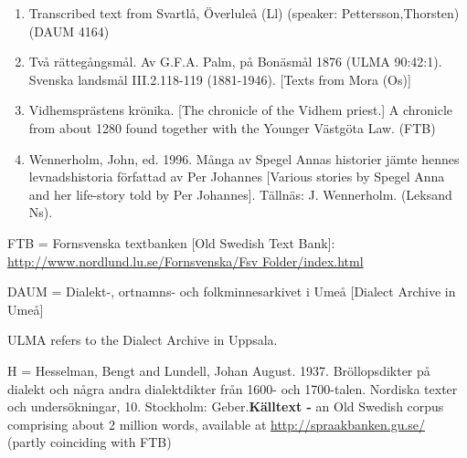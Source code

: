\begin{enumerate}
\item 
\label{bkm:Ref137880773}Transcribed text from Svartlå, Överluleå (Ll) (speaker: Pettersson,Thorsten) (DAUM 4164)

\item 
\label{bkm:Ref154203986}Två rättegångsmål. Av G.F.A. Palm, på Bonäsmål 1876 (ULMA 90:42:1). Svenska landsmål III.2.118-119 (1881-1946). [Texts from Mora (Os)]
\item 
\label{bkm:Ref137879614}\label{bkm:Ref261512115}Vidhemsprästens krönika. [The chronicle of the Vidhem priest.]\newline
A chronicle from about 1280 found together with the Younger Västgöta Law. (FTB) 
\item 
\label{bkm:Ref150067493}\label{bkm:Ref150327539}Wennerholm, John, ed. 1996. Många av Spegel Annas historier jämte hennes levnadshistoria författad av Per Johannes [Various stories by Spegel Anna and her life-story told by Per Johannes]. Tällnäs: J. Wennerholm. (Leksand Ns). 

\end{enumerate} %
FTB = Fornsvenska textbanken [Old Swedish Text Bank]: \url{http://www.nordlund.lu.se/Fornsvenska/Fsv Folder/index.html}

DAUM = Dialekt-, ortnamns- och folkminnesarkivet i Umeå [Dialect Archive in Umeå]

ULMA refers to the Dialect Archive in Uppsala.


H = Hesselman, Bengt and Lundell, Johan August. 1937. Bröllopsdikter på dialekt och några andra dialektdikter från 1600- och 1700-talen. Nordiska texter och undersökningar, 10. Stockholm: Geber.\textbf{Källtext - }an Old Swedish corpus comprising about 2 million words, available at \url{http://spraakbanken.gu.se/} (partly coinciding with FTB)

